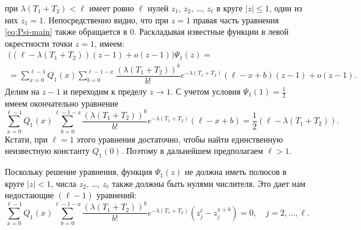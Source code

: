 \documentclass[10pt,oneside,final]{book}
\renewcommand{\leq}{\leqslant}
\begin{document}
 при
$\lambda(T_1+T_2)<\ell$ имеет ровно $\ell$ нулей $z_1$, $z_2$, \ldots, $z_\ell$ в круге $|z|\leq 1$, один из
них $z_1=1$. Непосредственно видно, что при $z=1$ правая часть уравнения
\eqref{eq:Psi-main} также обращается в $0$. Раскладывая известные функции в
левой окрестности точки $z=1$, имеем:
\begin{multline*}
  \bigl(({\ell} -\lambda (T_1+T_2))(z-1)+o(z-1)\bigr)\Psi_1(z) =
  \\ =
  \sum_{x=0}^{\ell-1}
  Q_1(x)\sum_{b=0}^{\ell-1-x} \dfrac{(\lambda (T_1+T_2))^b}{b!}e^{-\lambda (T_1+T_2)}
  (\ell-{x+b})(z-1)+o(z-1). 
\end{multline*}
Делим на $z-1$ и переходим к пределу $z\to1$. С учетом условия
$\Psi_1(1)=\frac12$ имеем окончательно уравнение
\[
\sum_{x=0}^{\ell-1}
Q_1(x)\sum_{b=0}^{\ell-1-x} \dfrac{(\lambda (T_1+T_2))^b}{b!}e^{-\lambda (T_1+T_2)}
(\ell-{x+b}) = \frac12(\ell-\lambda(T_1+T_2)).
\]
Кстати, при $\ell=1$ этого уравнения достаточно, чтобы найти единственную
неизвестную константу $Q_1(0)$. Поэтому в дальнейшем предполагаем $\ell>1$. 

Поскольку решение уравнения, функция $\Psi_1(z)$ не должна иметь
полюсов в круге $|z|<1$, числа $z_2$,  \ldots, $z_\ell$ также должны быть
нулями числителя. Это дает нам недостающие $(\ell-1)$ уравнений:
\[
\sum_{x=0}^{\ell-1}
Q_1(x)\sum_{b=0}^{\ell-1-x} \dfrac{(\lambda (T_1+T_2))^b}{b!}e^{-\lambda (T_1+T_2)}
  (z_j^\ell-z_j^{x+b})=0, \quad j=2, \ldots, \ell.
\]
\end{document}
